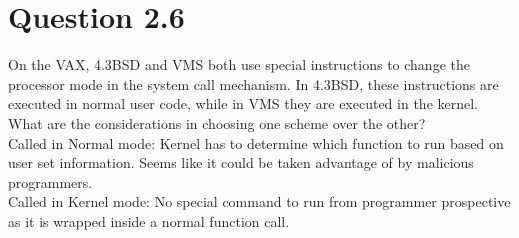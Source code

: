 \documentclass{article}
\begin{document}
\section*{Question 2.6}
On the VAX, 4.3BSD and VMS both use special instructions to change the processor mode in the system call mechanism. In 4.3BSD, these instructions are executed in normal user code, while in VMS they are executed in the kernel. What are the considerations in choosing one scheme over the other?
\\
Called in Normal mode: Kernel has to determine which function to run based on user set information.
Seems like it could be taken advantage of by malicious programmers.
\\
Called in Kernel mode: No special command to run from programmer prospective as it is wrapped inside a normal function call.
\end{document}
